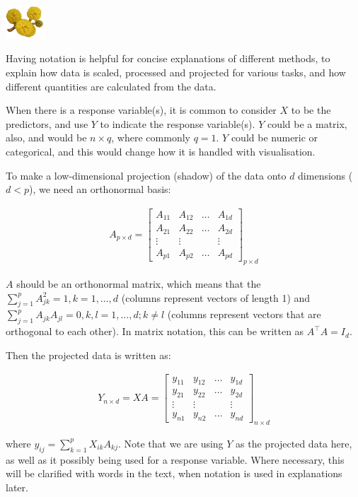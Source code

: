 \documentclass[
  letterpaper,
]{krantz}
\newcommand{\infobox}[1]{%
\noindent\colorbox{info!30}{%
\begin{minipage}{0.98\linewidth}%
    \centering%
    \begin{minipage}[c]{0.15\linewidth} %
      \includegraphics[width=1.5cm]{images/mulga-flowers2.png} %
    \end{minipage}%
    \hfill %
    \begin{minipage}[c]{0.8\linewidth} %
      \bigskip%
      \textsf{#1}%
      \bigskip%
    \end{minipage}%
    \hspace*{3mm}%
  \end{minipage}%
}%
}
\begin{document}

\infobox{Having notation is helpful for concise explanations of different methods, to explain how data is scaled, processed and projected for various tasks, and how different quantities are calculated from the data. }

When there is a response variable(s), it is common to consider \(X\) to
be the predictors, and use \(Y\) to indicate the response variable(s).
\(Y\) could be a matrix, also, and would be \(n\times q\), where
commonly \(q=1\). \(Y\) could be numeric or categorical, and this would
change how it is handled with visualisation.

To make a low-dimensional projection (shadow) of the data onto \(d\)
dimensions (\(d < p\)), we need an orthonormal basis:

\begin{eqnarray*}
A_{p\times d} = \left[ \begin{array}{cccc}
A_{11} & A_{12} & \dots & A_{1d} \\
A_{21} & A_{22} & \dots & A_{2d}\\
\vdots & \vdots &  & \vdots \\
A_{p1} & A_{p2} & \dots & A_{pd} \end{array} \right]_{p\times d}
\end{eqnarray*}

 

\(A\) should be an orthonormal matrix, which means that the
\(\sum_{j=1}^p A_{jk}^2=1, k=1, \dots, d\) (columns represent vectors of
length 1) and \(\sum_{j=1}^p A_{jk}A_{jl}=0, k,l=1, \dots, d; k\neq l\)
(columns represent vectors that are orthogonal to each other). In matrix
notation, this can be written as \(A^{\top}A = I_d\).

Then the projected data is written as:

\begin{eqnarray*}
Y_{n\times d} = XA = \left[ \begin{array}{cccc}
y_{11} & y_{12} & \dots & y_{1d} \\
y_{21} & y_{22} & \dots & y_{2d}\\
\vdots & \vdots &  & \vdots \\
y_{n1} & y_{n2} & \dots & y_{nd} \end{array} \right]_{n\times d}
\end{eqnarray*}

where \(y_{ij} = \sum_{k=1}^p X_{ik}A_{kj}\). Note that we are using
\(Y\) as the projected data here, as well as it possibly being used for
a response variable. Where necessary, this will be clarified with words
in the text, when notation is used in explanations later.
\end{document}
